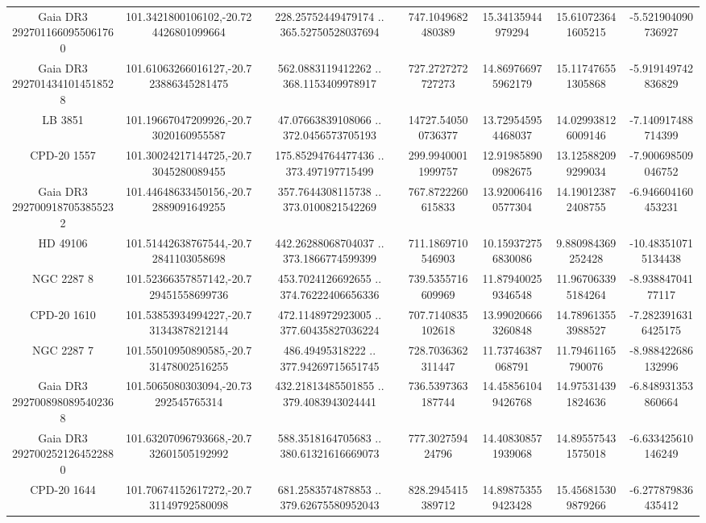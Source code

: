 \begin{table}
\begin{tabular}{ccccccc}
Gaia DR3 2927011660955061760 & 101.3421800106102,-20.724426801099664 & 228.25752449479174 .. 365.52750528037694 & 747.1049682480389 & 15.34135944979294 & 15.610723641605215 & -5.521904090736927 \\
Gaia DR3 2927014341014518528 & 101.61063266016127,-20.723886345281475 & 562.0883119412262 .. 368.1153409978917 & 727.2727272727273 & 14.869766975962179 & 15.117476551305868 & -5.919149742836829 \\
LB  3851 & 101.19667047209926,-20.73020160955587 & 47.07663839108066 .. 372.0456573705193 & 14727.540500736377 & 13.729545954468037 & 14.029938126009146 & -7.140917488714399 \\
CPD-20  1557 & 101.30024217144725,-20.73045280089455 & 175.85294764477436 .. 373.497197715499 & 299.99400011999757 & 12.919858900982675 & 13.125882099299034 & -7.900698509046752 \\
Gaia DR3 2927009187053855232 & 101.44648633450156,-20.72889091649255 & 357.7644308115738 .. 373.0100821542269 & 767.8722260615833 & 13.920064160577304 & 14.190123872408755 & -6.946604160453231 \\
HD  49106 & 101.51442638767544,-20.72841103058698 & 442.26288068704037 .. 373.1866774599399 & 711.1869710546903 & 10.159372756830086 & 9.880984369252428 & -10.483510715134438 \\
NGC  2287     8 & 101.52366357857142,-20.729451558699736 & 453.7024126692655 .. 374.76222406656336 & 739.5355716609969 & 11.879400259346548 & 11.967063395184264 & -8.93884704177117 \\
CPD-20  1610 & 101.53853934994227,-20.731343878212144 & 472.1148972923005 .. 377.60435827036224 & 707.7140835102618 & 13.990206663260848 & 14.789613553988527 & -7.2823916316425175 \\
NGC  2287     7 & 101.55010950890585,-20.731478002516255 & 486.49495318222 .. 377.94269715651745 & 728.7036362311447 & 11.73746387068791 & 11.79461165790076 & -8.988422686132996 \\
Gaia DR3 2927008980895402368 & 101.5065080303094,-20.73292545765314 & 432.21813485501855 .. 379.4083943024441 & 736.5397363187744 & 14.458561049426768 & 14.975314391824636 & -6.848931353860664 \\
Gaia DR3 2927002521264522880 & 101.63207096793668,-20.732601505192992 & 588.3518164705683 .. 380.61321616669073 & 777.302759424796 & 14.408308571939068 & 14.895575431575018 & -6.633425610146249 \\
CPD-20  1644 & 101.70674152617272,-20.731149792580098 & 681.2583574878853 .. 379.62675580952043 & 828.2945415389712 & 14.898753559423428 & 15.456815309879266 & -6.277879836435412 \\

\end{tabular}
\end{table}
